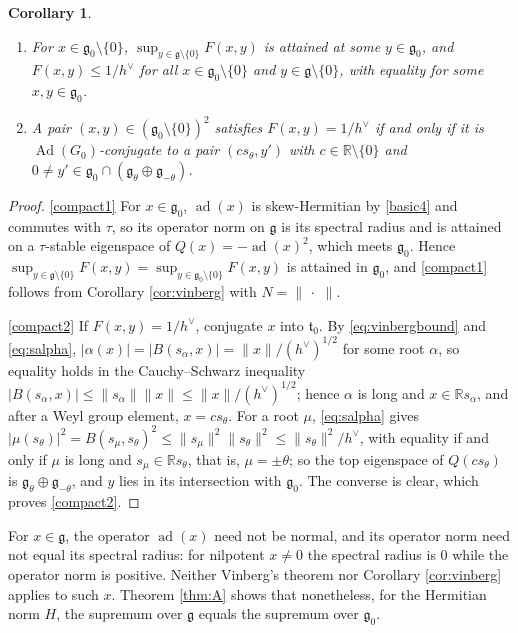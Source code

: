 \documentclass[leqno,10pt]{amsart}
\newtheorem{corollary}[theorem]{Corollary}%
\theoremstyle{definition}
\numberwithin{equation}{section}
\newcommand{\dum}{\,\cdot\,\,}
\newcommand{\al}{\alpha}
\newcommand{\g}{\mathfrak{g}}
\newcommand{\ad}{\operatorname{ad}}
\newcommand{\Ad}{\operatorname{Ad}}
\newcommand{\rea}{\mathbb R}
\newcommand{\gz}{\g_{0}}
\newcommand{\hv}{h^\vee}
\newcommand{\norm}[1]{\lVert #1\rVert}
\newcommand{\qad}{Q}
\begin{document}
\begin{corollary}\label{thm:compact}
\leavevmode\noindent
\begin{enumerate}[label=(\arabic*), ref=(\arabic*)]
\item\label{compact1} For $x \in \gz\setminus\{0\}$, $\sup_{y \in \g \setminus \{0\}}F(x, y)$ is attained at some $y \in \gz$, and $F(x, y) \leq 1/\hv$ for all $x \in \gz\setminus\{0\}$ and $y \in \g \setminus \{0\}$, with equality for some $x, y \in \gz$.
\item\label{compact2} A pair $(x, y) \in (\gz \setminus \{0\})^{2}$ satisfies $F(x, y) = 1/\hv$ if and only if it is $\Ad(G_{0})$-conjugate to a pair $(c s_{\theta}, y')$ with $c \in \rea \setminus \{0\}$ and $0 \neq y' \in \gz \cap (\g_{\theta} \oplus \g_{-\theta})$.
\end{enumerate}
\end{corollary}

\begin{proof}
\ref{compact1} For $x \in \gz$, $\ad(x)$ is skew-Hermitian by \eqref{basic4} and commutes with $\tau$, so its operator norm on $\g$ is its spectral radius and is attained on a $\tau$-stable eigenspace of $\qad(x) = -\ad(x)^{2}$, which meets $\gz$. Hence $\sup_{y \in \g\setminus\{0\}}F(x, y) = \sup_{y \in \gz\setminus\{0\}}F(x, y)$ is attained in $\gz$, and \ref{compact1} follows from Corollary \ref{cor:vinberg} with $N = \norm{\dum}$.

\ref{compact2} If $F(x, y) = 1/\hv$, conjugate $x$ into $\mathfrak{t}_{0}$. By \eqref{eq:vinbergbound} and \eqref{eq:salpha}, $|\al(x)| = |B(s_{\al}, x)| = \norm{x}/(\hv)^{1/2}$ for some root $\al$, so equality holds in the Cauchy--Schwarz inequality $|B(s_{\al}, x)| \leq \norm{s_{\al}}\norm{x} \leq \norm{x}/(\hv)^{1/2}$; hence $\al$ is long and $x \in \rea s_{\al}$, and after a Weyl group element, $x = cs_{\theta}$. For a root $\mu$, \eqref{eq:salpha} gives $|\mu(s_{\theta})|^{2} = B(s_{\mu}, s_{\theta})^{2} \leq \norm{s_{\mu}}^{2}\norm{s_{\theta}}^{2} \leq \norm{s_{\theta}}^{2}/\hv$, with equality if and only if $\mu$ is long and $s_{\mu} \in \rea s_{\theta}$, that is, $\mu = \pm\theta$; so the top eigenspace of $\qad(cs_{\theta})$ is $\g_{\theta} \oplus \g_{-\theta}$, and $y$ lies in its intersection with $\gz$. The converse is clear, which proves \ref{compact2}.
\end{proof}

For $x \in \g$, the operator $\ad(x)$ need not be normal, and its operator norm need not equal its spectral radius: for nilpotent $x \neq 0$ the spectral radius is $0$ while the operator norm is positive. Neither Vinberg's theorem nor Corollary \ref{cor:vinberg} applies to such $x$. Theorem \ref{thm:A} shows that nonetheless, for the Hermitian norm $H$, the supremum over $\g$ equals the supremum over $\gz$.
\end{document}
